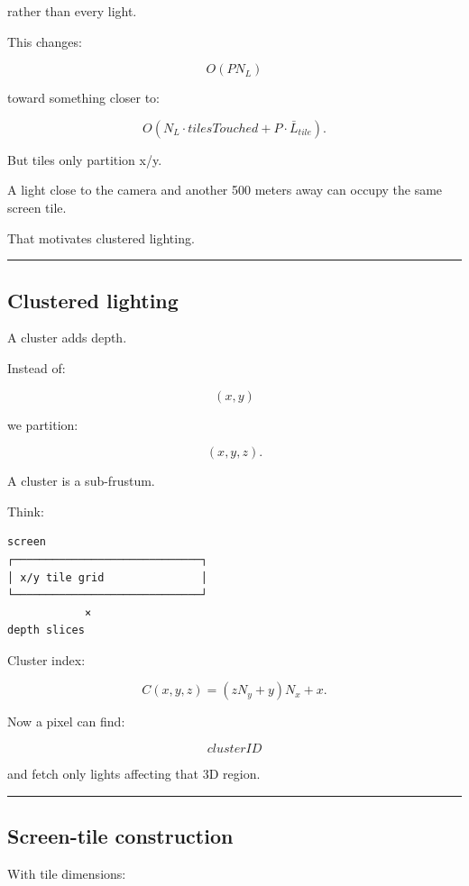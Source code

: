 rather than every light.

This changes:

\[
O(PN_L)
\]

toward something closer to:

\[
O(
N_L\cdot tilesTouched
+
P\cdot \bar L_{tile}
).
\]

But tiles only partition x/y.

A light close to the camera and another 500 meters away can occupy the same screen tile.

That motivates clustered lighting.

\begin{center}\rule{0.5\linewidth}{0.5pt}\end{center}

\subsection{Clustered lighting}\label{04-visual-computing-ii-ch040-clustered-lighting}

A cluster adds depth.

Instead of:

\[
(x,y)
\]

we partition:

\[
(x,y,z).
\]

A cluster is a sub-frustum.

Think:

\begin{verbatim}
screen
┌─────────────────────────────┐
│ x/y tile grid               │
└─────────────────────────────┘
            ×
depth slices
\end{verbatim}

Cluster index:

\[
\boxed{
C(x,y,z)
=
(zN_y+y)N_x+x.
}
\]

Now a pixel can find:

\[
clusterID
\]

and fetch only lights affecting that 3D region.

\begin{center}\rule{0.5\linewidth}{0.5pt}\end{center}

\subsection{Screen-tile construction}\label{04-visual-computing-ii-ch040-screen-tile-construction}

With tile dimensions:

